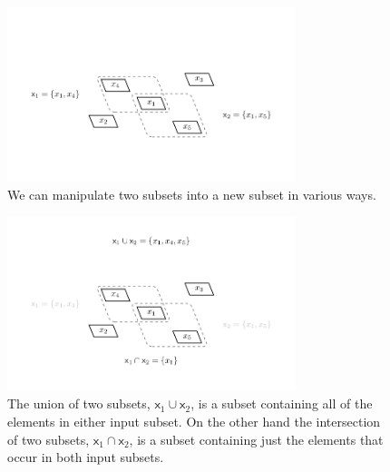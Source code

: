\documentclass[
  letterpaper,
  DIV=11,
  numbers=noendperiod]{scrartcl}
\begin{document}
\begin{figure}

{\centering \includegraphics[width=0.75\textwidth,height=\textheight]{figures/overlapping_subsets/overlapping_subsets.pdf}

}

\caption{\label{fig-subsets}We can manipulate two subsets into a new
subset in various ways.}

\end{figure}

\begin{figure}

{\centering \includegraphics[width=0.75\textwidth,height=\textheight]{figures/overlapping_subsets_ui/overlapping_subsets_ui.pdf}

}

\caption{\label{fig-ui}The union of two subsets,
\(\mathsf{x}_1 \cup \mathsf{x}_2\), is a subset containing all of the
elements in either input subset. On the other hand the intersection of
two subsets, \(\mathsf{x}_1 \cap \mathsf{x}_2\), is a subset containing
just the elements that occur in both input subsets.}

\end{figure}
\end{document}
